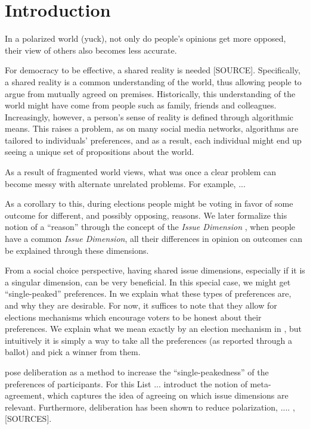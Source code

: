 \newpage
\chapter{Introduction}
\label{Introduction}


In a polarized world (yuck), not only do people's opinions get more opposed,
their view of others also becomes less accurate.

For democracy to be effective, a shared reality is needed [SOURCE].
Specifically, a shared reality is a common understanding of the world, thus
allowing people to argue from mutually agreed on premises. Historically, this
understanding of the world might have come from people such as family, friends
and colleagues. Increasingly, however, a person's sense of reality is defined
through algorithmic means. This raises a problem, as on many social media
networks, algorithms are tailored to individuals' preferences, and as a result,
each individual might end up seeing a unique set of propositions about the
world.

As a result of fragmented world views, what was once a clear problem can become
messy with alternate unrelated problems. For example, ...

As a corollary to this, during elections people might be voting in favor of
some outcome for different, and possibly opposing, reasons. We later formalize
this notion of a ``reason'' through the concept of the \textit{Issue Dimension}
\cite{listTwoConceptsAgreement2002}, when people have a
common \textit{Issue Dimension}, all their differences in opinion on outcomes
can be explained through these dimensions.

From a social choice perspective, having shared issue dimensions, especially if
it is a singular dimension, can be very beneficial. In this special case, we
might get ``single-peaked'' preferences. In  we explain what
these types of preferences are, and why they are desirable. For now, it
suffices to note that they allow for elections mechanisms which encourage
voters to be honest about their preferences. We explain what we mean exactly by
an election mechanism in , but intuitively it is
simply a way to take all the preferences (as reported through a ballot) and
pick a winner from them.

\citet{listTwoConceptsAgreement2002} pose deliberation as a method to increase
the ``single-peakedness'' of the preferences of participants. For this List ...
introduct the notion of meta-agreement, which captures the idea of agreeing on
which issue dimensions are relevant. Furthermore, deliberation has been shown
to reduce polarization, .... , [SOURCES].

